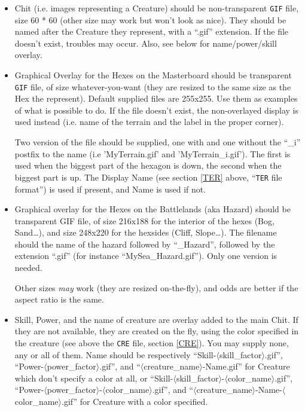 \documentclass{article}
\begin{document}
\begin{itemize}
\item Chit (i.e. images representing a Creature) should be non-transparent \texttt{GIF} file, size 60 * 60 (other size may work but won't look as nice). They should be named after the Creature they represent, with a ``.gif'' extension. If the file doesn't exist, troubles may occur. Also, see below for name/power/skill overlay.

\item Graphical Overlay for the Hexes on the Masterboard should be transparent \texttt{GIF} file, of size whatever-you-want (they are resized to the same size as the Hex the represent). Default supplied files are 255x255. Use them as examples of what is possible to do. If the file doesn't exist, the non-overlayed display is used instead (i.e. name of the terrain and the label in the proper corner).

Two version of the file should be supplied, one with and one without the ``\_i'' postfix to the name (i.e 'MyTerrain.gif' and 'MyTerrain\_i.gif'). The first is used when the biggest part of the hexagon is down, the second when the biggest part is up. The Display Name (see section \ref{TER} above, ``\texttt{TER} file format'') is used if present, and Name is used if not.

\item Graphical overlay for the Hexes on the Battlelands (aka Hazard) should be transparent GIF file, of size 216x188 for the interior of the hexes (Bog, Sand\ldots), and size 248x220 for the hexsides (Cliff, Slope\ldots). The filename should the name of the hazard followed by ``\_Hazard'', followed by the extension ``.gif'' (for instance ``MySea\_Hazard.gif''). Only one version is needed.

Other sizes \emph{may} work (they are resized on-the-fly), and odds are better if the aspect ratio is the same.

\item Skill, Power, and the name of creature are overlay added to the main Chit. If they are not available, they are created on the fly, using the color specified in the creature (see above the \texttt{CRE} file, section \ref{CRE}). You may supply none, any or all of them. Name should be respectively ``Skill-$\langle$skill\_factor$\rangle$.gif'', ``Power-$\langle$power\_factor$\rangle$.gif'', and ``$\langle$creature\_name$\rangle$-Name.gif'' for Creature which don't specify a color at all, or  ``Skill-$\langle$skill\_factor$\rangle$-$\langle$color\_name$\rangle$.gif'', ``Power-$\langle$power\_factor$\rangle$-$\langle$color\_name$\rangle$.gif'', and ``$\langle$creature\_name$\rangle$-Name-$\langle$color\_name$\rangle$.gif'' for Creature with a color specified.

\end{itemize}
\end{document}
